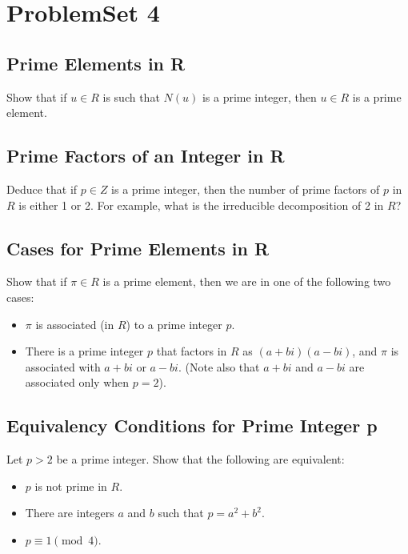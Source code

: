 \documentclass[lang=cn,11pt]{template}
\begin{document}
\chapter{ProblemSet 4}

\section{Prime Elements in R}
Show that if \( u \in R \) is such that \( N(u) \) is a prime integer, then \( u \in R \) is a prime element.

\section{Prime Factors of an Integer in R}
Deduce that if \( p \in Z \) is a prime integer, then the number of prime factors of \( p \) in \( R \) is either 1 or 2. For example, what is the irreducible decomposition of 2 in \( R \)?

\section{Cases for Prime Elements in R}
Show that if \( \pi \in R \) is a prime element, then we are in one of the following two cases:

\begin{itemize}
    \item \(\pi\) is associated (in \( R \)) to a prime integer \( p \).
    \item There is a prime integer \( p \) that factors in \( R \) as \( (a + bi)(a - bi) \), and \( \pi \) is associated with \( a + bi \) or \( a - bi \). (Note also that \( a + bi \) and \( a - bi \) are associated only when \( p = 2 \)).
\end{itemize}

\section{Equivalency Conditions for Prime Integer p}
Let \( p > 2 \) be a prime integer. Show that the following are equivalent:

\begin{itemize}
    \item \( p \) is not prime in \( R \).
    \item There are integers \( a \) and \( b \) such that \( p = a^2 + b^2 \).
    \item \( p \equiv 1 \pmod{4} \).
\end{itemize}
\end{document}
